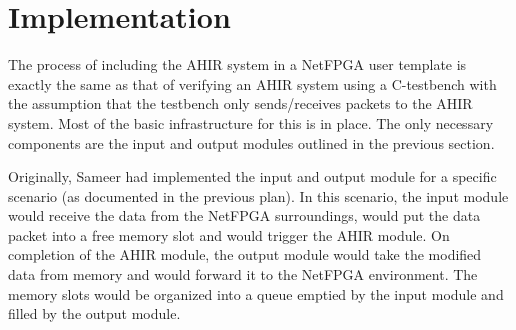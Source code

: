 \documentclass{article}
\begin{document}
\section{Implementation}

The process of including the AHIR system in a NetFPGA user template is
exactly the same as that of verifying an AHIR system using a C-testbench
with the assumption that the testbench only sends/receives packets to the AHIR 
system.  Most of the basic infrastructure for this is in place.  The only
necessary components are the input and output modules outlined in the 
previous section.

Originally, Sameer had implemented the input and output module for
a specific scenario (as documented in the previous plan).  In this
scenario, the input module would receive the data from the NetFPGA
surroundings, would put the data packet into a free memory slot and would trigger
the AHIR module.  On completion of the AHIR module, the output module
would take the modified data from memory and would forward it to
the NetFPGA environment.   The memory slots would be organized into
a queue emptied by the input module and filled by the output module.
\end{document}
